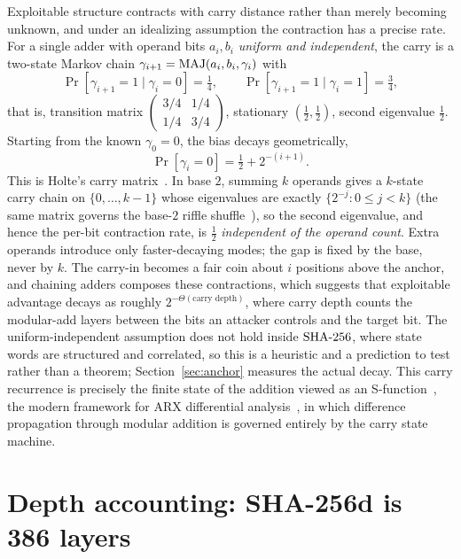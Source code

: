\documentclass[11pt]{article}
\begin{document}
Exploitable structure contracts with carry distance rather than merely
becoming unknown, and under an idealizing assumption the contraction has a
precise rate. For a single adder with operand bits $a_i,b_i$ \emph{uniform
and independent}, the carry is a two-state Markov chain $\gamma_{i+1} =
\mathrm{MAJ}(a_i,b_i,\gamma_i)$ with
\[
  \Pr[\gamma_{i+1}{=}1\mid \gamma_i{=}0] = \tfrac14,
  \qquad
  \Pr[\gamma_{i+1}{=}1\mid \gamma_i{=}1] = \tfrac34,
\]
that is, transition matrix $\left(\begin{smallmatrix}3/4 & 1/4\\ 1/4 &
3/4\end{smallmatrix}\right)$, stationary $(\tfrac12,\tfrac12)$, second
eigenvalue $\tfrac12$. Starting from the known $\gamma_0 = 0$, the bias
decays geometrically,
\[
  \Pr[\gamma_i = 0] = \tfrac12 + 2^{-(i+1)}.
\]
This is Holte's carry matrix~\cite{holte}. In base $2$, summing $k$
operands gives a $k$-state carry chain on $\{0,\dots,k-1\}$ whose
eigenvalues are exactly $\{2^{-j}:0\le j<k\}$ (the same matrix governs the
base-$2$ riffle shuffle~\cite{diaconisfulman}), so the second eigenvalue,
and hence the per-bit contraction rate, is $\tfrac12$ \emph{independent of
the operand count}. Extra operands introduce only faster-decaying modes;
the gap is fixed by the base, never by $k$. The carry-in becomes a fair
coin about $i$ positions above the anchor, and chaining adders composes
these contractions, which suggests that exploitable advantage decays as
roughly $2^{-\Theta(\text{carry depth})}$, where carry depth counts the
modular-add layers between the bits an attacker controls and the target
bit. The uniform-independent assumption does not hold inside $\mathrm{SHA\text{-}256}$, where
state words are structured and correlated, so this is a heuristic and a
prediction to test rather than a theorem; Section~\ref{sec:anchor} measures
the actual decay. This carry recurrence is precisely the finite state of
the addition viewed as an S-function~\cite{sfunction}, the modern framework
for ARX differential analysis~\cite{arx}, in which difference propagation
through modular addition is governed entirely by the carry state machine.

\section{Depth accounting: SHA-256d is 386 layers}\label{sec:accounting}
\end{document}

